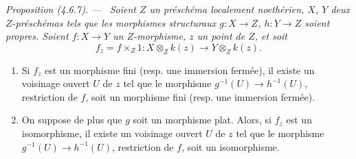 \documentclass[10pt,oneside]{book}
\newenvironment{proposition}[1][]{%
  \par\medskip\noindent\itshape Proposition (#1). ---\ }{\par}
\begin{document}
\setcounter{section}{4}\setcounter{subsection}{6}
\begin{proposition}[4.6.7]
\label{III.4.6.7-fr}
Soient $Z$ un préschéma localement noethérien, $X$, $Y$ deux $Z$-préschémas
tels que les morphismes structuraux $g:X\to Z$, $h:Y\to Z$ soient propres.
Soient $f:X\to Y$ un $Z$-morphisme, $z$ un point de $Z$, et soit
\[
f_z=f\times_Z1:
X\otimes_Zk(z)\longrightarrow Y\otimes_Zk(z).
\]
\begin{enumerate}
\item[(i)] Si $f_z$ est un morphisme fini (resp. une immersion fermée), il
existe un voisinage ouvert $U$ de $z$ tel que le morphisme
$g^{-1}(U)\to h^{-1}(U)$, restriction de $f$, soit un morphisme fini (resp.
une immersion fermée).
\item[(ii)] On suppose de plus que $g$ soit un morphisme plat. Alors, si
$f_z$ est un isomorphisme, il existe un voisinage ouvert $U$ de $z$ tel que
le morphisme $g^{-1}(U)\to h^{-1}(U)$, restriction de $f$, soit un
isomorphisme.
\end{enumerate}
\end{proposition}
\end{document}
